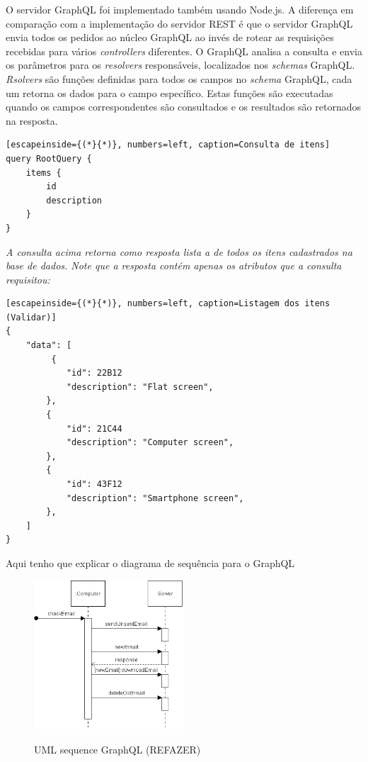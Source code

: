O servidor GraphQL foi implementado também usando Node.js. A diferença em comparação com a implementação do servidor REST é que o servidor GraphQL envia todos os pedidos ao núcleo GraphQL ao invés de rotear as requisições recebidas para vários \textit{controllers} diferentes. O GraphQL analisa a consulta e envia os parâmetros para os \textit{resolvers} responsáveis, localizados nos \textit{schemas} GraphQL. \textit{Rsolvers} são funções definidas para todos os campos no \textit{schema} GraphQL, cada um retorna os dados para o campo específico. Estas funções são executadas quando os campos correspondentes são consultados e os resultados são retornados na resposta.

\begin{lstlisting}[escapeinside={(*}{*)}, numbers=left, caption=Consulta de itens]
query RootQuery {
	items {
    	id
    	description
    }
}

\end{lstlisting}

 \textit{ A consulta acima retorna como resposta lista a de todos os itens cadastrados na base de dados. Note que a resposta contém apenas os atributos que a consulta requisitou: }

\begin{lstlisting}[escapeinside={(*}{*)}, numbers=left, caption=Listagem dos itens (Validar)]
{
    "data": [
         {
        	"id": 22B12
            "description": "Flat screen",
        },
        {
        	"id": 21C44
            "description": "Computer screen",
        },
        {
        	"id": 43F12
            "description": "Smartphone screen",
        },
    ]
}

\end{lstlisting}

Aqui tenho que explicar o diagrama de sequência para o GraphQL

\begin{figure}[htbp]
\centering
\includegraphics[width=0.5\textwidth]{figuras/uml-sequence.png}
\label{fig:graph-uml}
\caption{UML sequence GraphQL (REFAZER)}
\author{fonte: Autor}
\end{figure}
\pagebreak



